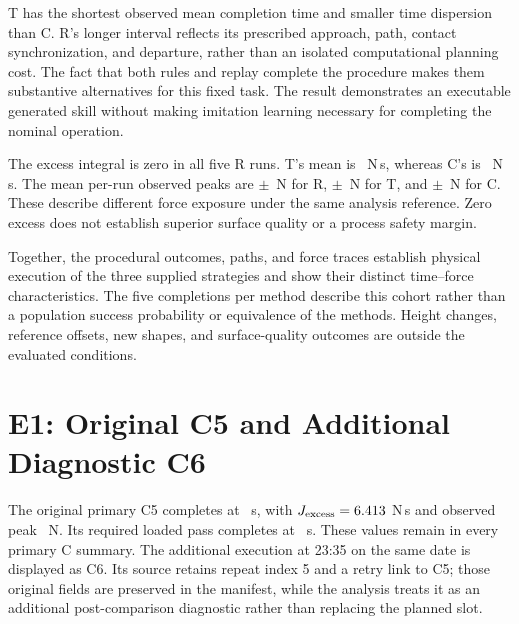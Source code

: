 
T has the shortest observed mean completion time and smaller time dispersion than C. R's longer interval reflects its prescribed approach, path, contact synchronization, and departure, rather than an isolated computational planning cost. The fact that both rules and replay complete the procedure makes them substantive alternatives for this fixed task. The result demonstrates an executable generated skill without making imitation learning necessary for completing the nominal operation.

The excess integral is zero in all five R runs. T's mean is \EoneTExcess~N\,s, whereas C's is \EoneCExcess~N\,s. The mean per-run observed peaks are \EoneRPeak\(\pm\)\EoneRPeakSD~N for R, \EoneTPeak\(\pm\)\EoneTPeakSD~N for T, and \EoneCPeak\(\pm\)\EoneCPeakSD~N for C. These describe different force exposure under the same analysis reference. Zero excess does not establish superior surface quality or a process safety margin.



Together, the procedural outcomes, paths, and force traces establish physical execution of the three supplied strategies and show their distinct time--force characteristics. The five completions per method describe this cohort rather than a population success probability or equivalence of the methods. Height changes, reference offsets, new shapes, and surface-quality outcomes are outside the evaluated conditions.

\section{E1: Original C5 and Additional Diagnostic C6}
The original primary C5 completes at \CfiveTime~s, with \(J_{\mathrm{excess}}=6.413\) N\,s and observed peak \CfivePeak~N. Its required loaded pass completes at \CfivePass~s. These values remain in every primary C summary. The additional execution at 23:35 on the same date is displayed as C6. Its source retains repeat index 5 and a retry link to C5; those original fields are preserved in the manifest, while the analysis treats it as an additional post-comparison diagnostic rather than replacing the planned slot.

